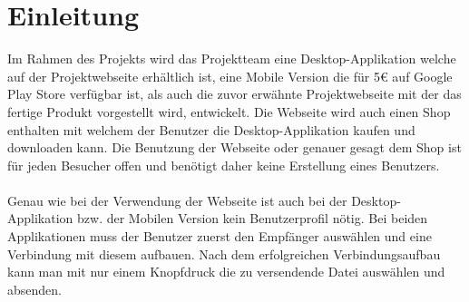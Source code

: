 \section{Einleitung}
Im Rahmen des Projekts wird das Projektteam eine Desktop-Applikation welche auf der Projektwebseite erhältlich ist, eine Mobile Version die für 5€ auf Google Play Store verfügbar ist, als auch die zuvor erwähnte Projektwebseite mit der das fertige Produkt vorgestellt wird, entwickelt. Die Webseite wird auch einen Shop enthalten mit welchem der Benutzer die Desktop-Applikation kaufen und downloaden kann. Die Benutzung der Webseite oder genauer gesagt dem Shop ist für jeden Besucher offen und benötigt daher keine Erstellung eines Benutzers.
\\\\
Genau wie bei der Verwendung der Webseite ist auch bei der Desktop-Applikation bzw. der Mobilen Version kein Benutzerprofil nötig. Bei beiden Applikationen muss der Benutzer zuerst den Empfänger auswählen und eine Verbindung mit diesem aufbauen. Nach dem erfolgreichen Verbindungsaufbau kann man mit nur einem Knopfdruck die zu versendende Datei auswählen und absenden. 